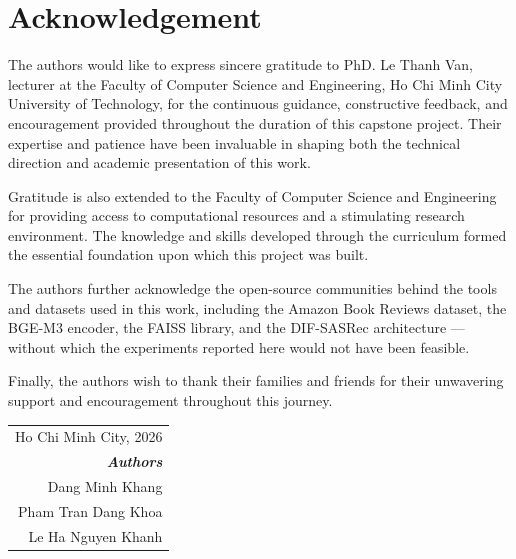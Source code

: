 \chapter*{Acknowledgement}

The authors would like to express sincere gratitude to PhD. Le Thanh Van, lecturer at the Faculty of Computer Science and Engineering, Ho Chi Minh City University of Technology, for the continuous guidance, constructive feedback, and encouragement provided throughout the duration of this capstone project.
Their expertise and patience have been invaluable in shaping both the technical direction and academic presentation of this work.

Gratitude is also extended to the Faculty of Computer Science and Engineering for providing access to computational resources and a stimulating research environment.
The knowledge and skills developed through the curriculum formed the essential foundation upon which this project was built.

The authors further acknowledge the open-source communities behind the tools and datasets used in this work, including the Amazon Book Reviews dataset, the BGE-M3 encoder, the FAISS library, and the DIF-SASRec architecture — without which the experiments reported here would not have been feasible.

Finally, the authors wish to thank their families and friends for their unwavering support and encouragement throughout this journey.

\vspace{2cm}

\begin{flushright}
\begin{tabular}{r}
    Ho Chi Minh City, 2026 \\
    \textit{\textbf{Authors}} \\
    Dang Minh Khang \\
    Pham Tran Dang Khoa \\
    Le Ha Nguyen Khanh
\end{tabular}
\end{flushright}

